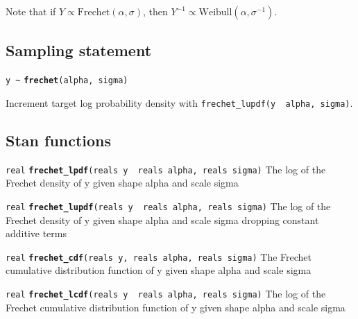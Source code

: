 \documentclass[
  10pt,
]{book}
\begin{document}
Note that if \(Y \propto \text{Frechet}(\alpha,\sigma)\), then \(Y^{-1} \propto \text{Weibull}(\alpha,\sigma^{-1})\).

\hypertarget{sampling-statement-40}{%
\subsection{Sampling statement}\label{sampling-statement-40}}

\texttt{y\ \textasciitilde{}} \textbf{\texttt{frechet}}\texttt{(alpha,\ sigma)}

Increment target log probability density with \texttt{frechet\_lupdf(y\ \textbar{}\ alpha,\ sigma)}.

\hypertarget{stan-functions-39}{%
\subsection{Stan functions}\label{stan-functions-39}}


\texttt{real} \textbf{\texttt{frechet\_lpdf}}\texttt{(reals\ y\ \textbar{}\ reals\ alpha,\ reals\ sigma)}\newline
The log of the Frechet density of y given shape alpha and scale sigma


\texttt{real} \textbf{\texttt{frechet\_lupdf}}\texttt{(reals\ y\ \textbar{}\ reals\ alpha,\ reals\ sigma)}\newline
The log of the Frechet density of y given shape alpha and scale sigma
dropping constant additive terms


\texttt{real} \textbf{\texttt{frechet\_cdf}}\texttt{(reals\ y,\ reals\ alpha,\ reals\ sigma)}\newline
The Frechet cumulative distribution function of y given shape alpha
and scale sigma


\texttt{real} \textbf{\texttt{frechet\_lcdf}}\texttt{(reals\ y\ \textbar{}\ reals\ alpha,\ reals\ sigma)}\newline
The log of the Frechet cumulative distribution function of y given
shape alpha and scale sigma
\end{document}

